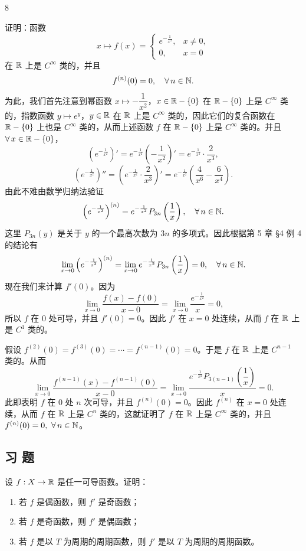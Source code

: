 \begin{sourceexample}{8}

	证明：函数
	\[
	x\longmapsto f(x)=\begin{cases} e^{-\frac1{x^2}}, & x\neq0, \\ 0, & x=0 \end{cases}
	\]
	在 \(\mathbb{R}\) 上是 \(C^\infty\) 类的，并且
	\[
	f^{(n)}(0)=0,\quad\forall\,n\in\mathbb{N}.
	\]
	为此，我们首先注意到幂函数 \(x\longmapsto-\dfrac1{x^2}\)，\(x\in\mathbb{R}-\{0\}\) 在 \(\mathbb{R}-\{0\}\) 上是 \(C^\infty\) 类的，指数函数 \(y\longmapsto e^y\)，\(y\in\mathbb{R}\) 在 \(\mathbb{R}\) 上是 \(C^\infty\) 类的，因此它们的复合函数在 \(\mathbb{R}-\{0\}\) 上也是 \(C^\infty\) 类的，从而上述函数 \(f\) 在 \(\mathbb{R}-\{0\}\) 上是 \(C^\infty\) 类的。并且 \(\forall\,x\in\mathbb{R}-\{0\}\)，
	\[
	\left(e^{-\frac1{x^2}}\right)'=e^{-\frac1{x^2}}\left(-\frac1{x^2}\right)'=e^{-\frac1{x^2}}\cdot\frac2{x^3},
	\]
	\[
	\left(e^{-\frac1{x^2}}\right)''=\left(e^{-\frac1{x^2}}\cdot\frac2{x^3}\right)'=e^{-\frac1{x^2}}\left(\frac4{x^6}-\frac6{x^4}\right).
	\]
	由此不难由数学归纳法验证
	\[
	\left(e^{-\frac1{x^2}}\right)^{(n)}=e^{-\frac1{x^2}}P_{3n}\left(\frac1x\right),\quad\forall\,n\in\mathbb{N}.
	\]
	这里 \(P_{3n}(y)\) 是关于 \(y\) 的一个最高次数为 \(3n\) 的多项式。因此根据第 5 章 §4 例 4 的结论有
	\[
	\lim_{x\to0}\left(e^{-\frac1{x^2}}\right)^{(n)}=\lim_{x\to0}e^{-\frac1{x^2}}P_{3n}\left(\frac1x\right)=0,\quad\forall\,n\in\mathbb{N}.
	\]
	现在我们来计算 \(f'(0)\)。因为
	\[
	\lim_{x\to0}\frac{f(x)-f(0)}{x-0}=\lim_{x\to0}\frac{e^{-\frac1{x^2}}}{x}=0,
	\]
	所以 \(f\) 在 \(0\) 处可导，并且 \(f'(0)=0\)。因此 \(f'\) 在 \(x=0\) 处连续，从而 \(f\) 在 \(\mathbb{R}\) 上是 \(C^1\) 类的。

	假设 \(f^{(2)}(0)=f^{(3)}(0)=\cdots=f^{(n-1)}(0)=0\)。于是 \(f\) 在 \(\mathbb{R}\) 上是 \(C^{n-1}\) 类的。从而
	\[
	\lim_{x\to0}\frac{f^{(n-1)}(x)-f^{(n-1)}(0)}{x-0}=\lim_{x\to0}\frac{e^{-\frac1{x^2}}P_{3(n-1)}\left(\dfrac1x\right)}{x}=0.
	\]
	此即表明 \(f\) 在 \(0\) 处 \(n\) 次可导，并且 \(f^{(n)}(0)=0\)。因此 \(f^{(n)}\) 在 \(x=0\) 处连续，从而 \(f\) 在 \(\mathbb{R}\) 上是 \(C^n\) 类的，这就证明了 \(f\) 在 \(\mathbb{R}\) 上是 \(C^\infty\) 类的，并且 \(f^{(n)}(0)=0,\ \forall\,n\in\N\)。

\end{sourceexample}

\subsection*{习 题}

\begin{exercise}
	\item 设 \(f:X\to\mathbb{R}\) 是任一可导函数。证明：
	\begin{enumerate}[label=\arabic*)]
		\item 若 \(f\) 是偶函数，则 \(f'\) 是奇函数；
		\item 若 \(f\) 是奇函数，则 \(f'\) 是偶函数；
		\item 若 \(f\) 是以 \(T\) 为周期的周期函数，则 \(f'\) 是以 \(T\) 为周期的周期函数。
	\end{enumerate}
\end{exercise}


